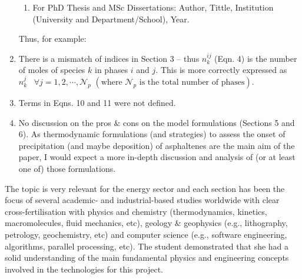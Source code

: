 \documentclass[14pt,twoside]{report}
\begin{document}
\begin{enumerate}
\begin{enumerate}
\item For PhD Thesis and MSc Dissertations: Author, Tittle, Institution (University and Department/School), Year.
\end{enumerate}  
Thus, for example:
%
\item There is a mismatch of indices in Section 3 -- thus $n_{k}^{ij}$ (Eqn. 4) is the number of moles of species $k$ in phases $i$ and $j$. This is more correctly expressed as $n_{k}^{j} \;\;\; \forall j={1,2,\cdots, \mathcal{N}_{p}}$ $\left(\text{where }\mathcal{N}_{p}\text{ is the total number of phases}\right)$. 
%
\item Terms in Eqns. 10 and 11 were not defined.
%
\item No discussion on the pros $\&$ cons on the model formulations (Sections 5 and 6). As thermodynamic formulations (and strategies) to assess the onset of precipitation (and maybe deposition) of asphaltenes are the main aim of the paper, I would expect a more in-depth discussion and analysis of (or at least one of) those formulations.    
% 
\end{enumerate}

The topic is very relevant for the energy sector and each section has been the focus of several academic- and industrial-based studies worldwide with clear cross-fertilisation with physics and chemistry (thermodynamics, kinetics, macromolecules, fluid mechanics, etc), geology $\&$ geophysics (e.g., lithography, petrology, geochemistry, etc) and computer science (e.g., software engineering, algorithms, parallel processing, etc).  The student demonstrated that she had a solid understanding of the main fundamental physics and engineering concepts involved in the technologies for this project.
\end{document}
